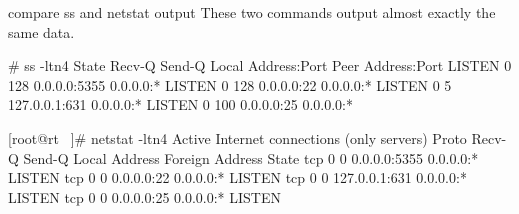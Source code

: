 \cprotect\note{

}

\begin{frame}
	{compare ss and netstat output} 
	These two commands output almost exactly the same data. 
	\begin{raw}
[root@rt ~]# ss  -ltn4 
State       Recv-Q      Send-Q      Local Address:Port       Peer Address:Port     
LISTEN      0           128               0.0.0.0:5355            0.0.0.0:*        
LISTEN      0           128               0.0.0.0:22              0.0.0.0:*        
LISTEN      0           5               127.0.0.1:631             0.0.0.0:*        
LISTEN      0           100               0.0.0.0:25              0.0.0.0:*        

[root@rt ~]# netstat  -ltn4 
Active Internet connections (only servers)
Proto Recv-Q Send-Q Local Address           Foreign Address         State      
tcp        0      0 0.0.0.0:5355            0.0.0.0:*               LISTEN     
tcp        0      0 0.0.0.0:22              0.0.0.0:*               LISTEN     
tcp        0      0 127.0.0.1:631           0.0.0.0:*               LISTEN     
tcp        0      0 0.0.0.0:25              0.0.0.0:*               LISTEN 
	\end{raw} 
\end{frame}
\cprotect\note{
	}
